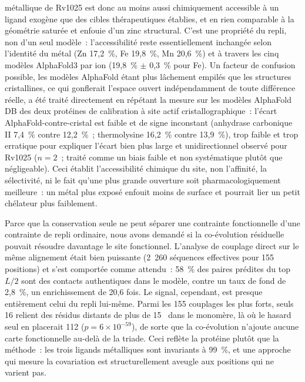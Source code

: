 \documentclass[11pt,a4paper]{article}
\newcommand{\ang}{\text{\AA}}
\begin{document}
métallique de Rv1025 est donc au moins aussi chimiquement accessible à un ligand exogène que des cibles thérapeutiques établies, et en rien comparable à la géométrie saturée et enfouie d'un zinc structural. C'est une propriété du repli, non d'un seul modèle~: l'accessibilité reste essentiellement inchangée selon l'identité du métal (Zn 17,2~\%, Fe 19,8~\%, Mn 20,6~\%) et à travers les cinq modèles AlphaFold3 par ion (19,8~\% $\pm$ 0,3~\% pour Fe). Un facteur de confusion possible, les modèles AlphaFold étant plus lâchement empilés que les structures cristallines, ce qui gonflerait l'espace ouvert indépendamment de toute différence réelle, a été traité directement en répétant la mesure sur les modèles AlphaFold DB des deux protéines de calibration à site actif cristallographique~: l'écart AlphaFold-contre-cristal est faible et de signe inconstant (anhydrase carbonique II 7,4~\% contre 12,2~\%~; thermolysine 16,2~\% contre 13,9~\%), trop faible et trop erratique pour expliquer l'écart bien plus large et unidirectionnel observé pour Rv1025 ($n=2$~; traité comme un biais faible et non systématique plutôt que négligeable). Ceci établit l'accessibilité chimique du site, non l'affinité, la sélectivité, ni le fait qu'une plus grande ouverture soit pharmacologiquement meilleure~: un métal plus exposé enfouit moins de surface et pourrait lier un petit chélateur plus faiblement.

Parce que la conservation seule ne peut séparer une contrainte fonctionnelle d'une contrainte de repli ordinaire, nous avons demandé si la co-évolution résiduelle pouvait résoudre davantage le site fonctionnel. L'analyse de couplage direct sur le même alignement était bien puissante (2~260 séquences effectives pour 155 positions) et s'est comportée comme attendu~: 58~\% des paires prédites du top $L/2$ sont des contacts authentiques dans le modèle, contre un taux de fond de 2,8~\%, un enrichissement de 20,6 fois. Le signal, cependant, est presque entièrement celui du repli lui-même. Parmi les 155 couplages les plus forts, seuls 16 relient des résidus distants de plus de 15~\ang{} dans le monomère, là où le hasard seul en placerait 112 ($p=6\times10^{-59}$), de sorte que la co-évolution n'ajoute aucune carte fonctionnelle au-delà de la triade. Ceci reflète la protéine plutôt que la méthode~: les trois ligands métalliques sont invariants à 99~\%, et une approche qui mesure la covariation est structurellement aveugle aux positions qui ne varient pas.
\end{document}
